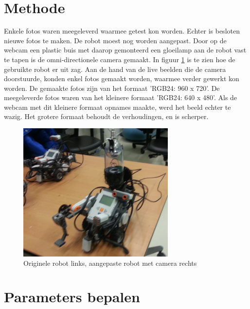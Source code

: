 \documentclass[a4paper]{article}
\begin{document}
\section{Methode}
Enkele fotos waren meegeleverd waarmee getest kon worden. Echter is besloten nieuwe fotos te maken. De robot moest nog worden aangepast. Door op de webcam een plastic buis met daarop gemonteerd een gloeilamp aan de robot vast te tapen is de omni-directionele camera gemaakt. In figuur \ref{fig:opstelling} is te zien hoe de gebruikte robot er uit zag. Aan de hand van de live beelden die de camera doorstuurde, konden enkel fotos gemaakt worden, waarmee verder gewerkt kon worden. De gemaakte fotos zijn van het formaat 'RGB24: 960 x 720'. De meegeleverde fotos waren van het kleinere formaat 'RGB24: 640 x 480'. Als de webcam met dit kleinere formaat opnames maakte, werd het beeld echter te wazig. Het grotere formaat behoudt de verhoudingen, en is scherper.
\begin{figure}[h]
	\centering
	\includegraphics[width=0.7\textwidth]{img/opstelling.jpg}
	\caption{Originele robot links, aangepaste robot met camera rechts}
	\label{fig:opstelling}
\end{figure}
\section{Parameters bepalen}
\end{document}
